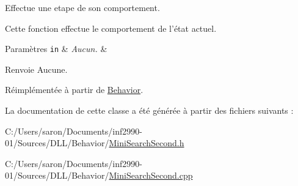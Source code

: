 Effectue une etape de son comportement. 

Cette fonction effectue le comportement de l'état actuel.


\begin{DoxyParams}[1]{Paramètres}
\mbox{\tt in}  & {\em Aucun.} & \\
\hline
\end{DoxyParams}
\begin{DoxyReturn}{Renvoie}
Aucune. 
\end{DoxyReturn}


Réimplémentée à partir de \hyperlink{group__inf2990_gac22f205bc85075ff707ad1f695c18439}{Behavior}.



La documentation de cette classe a été générée à partir des fichiers suivants \-:\begin{DoxyCompactItemize}
\item 
C\-:/\-Users/saron/\-Documents/inf2990-\/01/\-Sources/\-D\-L\-L/\-Behavior/\hyperlink{_mini_search_second_8h}{Mini\-Search\-Second.\-h}\item 
C\-:/\-Users/saron/\-Documents/inf2990-\/01/\-Sources/\-D\-L\-L/\-Behavior/\hyperlink{_mini_search_second_8cpp}{Mini\-Search\-Second.\-cpp}\end{DoxyCompactItemize}
